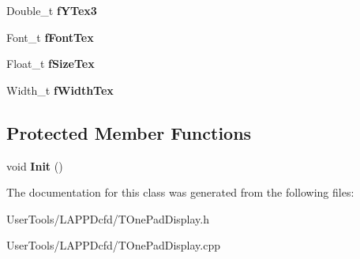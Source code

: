 \begin{DoxyCompactItemize}
\item 
\hypertarget{classTOnePadDisplay_ab1ca22badcfd78f0754552e83aa70987}{Double\-\_\-t {\bfseries f\-Y\-Tex3}}\label{classTOnePadDisplay_ab1ca22badcfd78f0754552e83aa70987}

\item 
\hypertarget{classTOnePadDisplay_a7256172fd4184c2ecfa4af09a2e6faa9}{Font\-\_\-t {\bfseries f\-Font\-Tex}}\label{classTOnePadDisplay_a7256172fd4184c2ecfa4af09a2e6faa9}

\item 
\hypertarget{classTOnePadDisplay_af86d15946760ffb5cf6a0232cb1225d7}{Float\-\_\-t {\bfseries f\-Size\-Tex}}\label{classTOnePadDisplay_af86d15946760ffb5cf6a0232cb1225d7}

\item 
\hypertarget{classTOnePadDisplay_acabff5a8446725b3b15e699db75d1cde}{Width\-\_\-t {\bfseries f\-Width\-Tex}}\label{classTOnePadDisplay_acabff5a8446725b3b15e699db75d1cde}

\end{DoxyCompactItemize}
\subsection*{Protected Member Functions}
\begin{DoxyCompactItemize}
\item 
\hypertarget{classTOnePadDisplay_ac4b99626bd39ddfa57b2dddbdeed93c7}{void {\bfseries Init} ()}\label{classTOnePadDisplay_ac4b99626bd39ddfa57b2dddbdeed93c7}

\end{DoxyCompactItemize}


The documentation for this class was generated from the following files\-:\begin{DoxyCompactItemize}
\item 
User\-Tools/\-L\-A\-P\-P\-Dcfd/T\-One\-Pad\-Display.\-h\item 
User\-Tools/\-L\-A\-P\-P\-Dcfd/T\-One\-Pad\-Display.\-cpp\end{DoxyCompactItemize}

